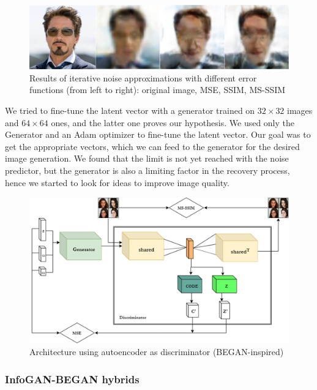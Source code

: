 \documentclass{egpubl}
\begin{document}
\begin{figure}[!htb]
	\centering
	\includegraphics[width=\linewidth]{pic/tony_iterative}
	\caption{Results of iterative noise approximations with different error functions (from left to right): original image, MSE, SSIM, MS-SSIM}
	\label{fig:tony_iterative}
\end{figure}

We tried to fine-tune the latent vector with a generator trained on $32\times 32$ images and $64\times 64$ ones, %
and the latter one proves our hypothesis. %
We used only the Generator and an Adam optimizer to fine-tune the latent vector. Our goal was to get the appropriate vectors, %
which we can feed to the generator for the desired image generation. We found %
that the limit is not yet reached with the noise predictor, %
but the generator is also a limiting factor in the recovery process, hence we started to look for ideas to improve image quality.

\begin{figure}[!htb]
	\centering
	\includegraphics[width=\linewidth]{pic/3}
	\caption{Architecture using autoencoder as discriminator (BEGAN-inspired)}
	\label{fig:infogan_ae}
\end{figure}

\subsubsection{InfoGAN-BEGAN hybrids}
\end{document}
